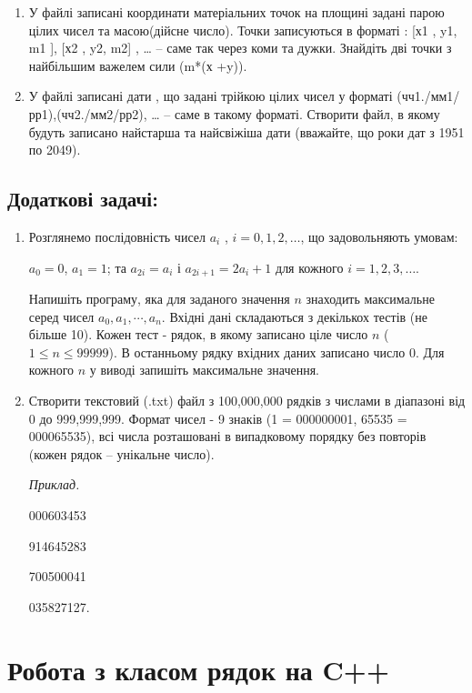 \documentclass[a5paper,titlepage,openany,twoside,
]
{book_unv}%
\begin{document}
\begin{enumerate}
\item 
У файлі записані координати матеріальних точок на площині задані
парою цілих чисел та масою(дійсне число). Точки записуються в форматі :
{[}х1 , y1, m1 {]}, {[}х2 , y2, m2{]} , \ldots{}  -- саме так
через коми та дужки. Знайдіть дві точки з найбільшим важелем сили (m*(х
+y)).

\item 
У файлі записані дати , що задані трійкою цілих чисел у форматі
(чч1./мм1/рр1),(чч2./мм2/рр2), \ldots{} -- саме в такому форматі.
Створити файл, в якому будуть записано найстарша та найсвіжіша дати
(вважайте, що роки дат з 1951 по 2049).
\end{enumerate}


\section{Додаткові задачі:}
\begin{enumerate}
\def\labelenumi{\arabic{enumi})}
\setcounter{enumi}{21}

\item  Розглянемо послідовність чисел \(a_{i}\) , $i = 0, 1, 2, \ldots$, що
задовольняють умовам:

\(a_{0} = 0\), \(a_{1} = 1\); та \(a_{2i} = a_{i}\) і
\(a_{2i + 1} = {2a}_{i} + 1\) для кожного $i = 1, 2, 3, \ldots{} $.

Напишіть програму, яка для заданого значення $n$ знаходить максимальне
серед чисел \(a_{0},a_{1},\cdots,a_{n}\). Вхідні дані складаються з
декількох тестів (не більше 10). Кожен тест - рядок, в якому записано
ціле число $n$ ($1 \le n \le 99 999$). В останньому рядку вхідних даних записано
число 0. Для кожного $n$ у виводі запишіть максимальне значення.

\item
Створити текстовий (.txt) файл з 100,000,000 рядків з числами
в діапазоні від 0 до 999,999,999. Формат чисел - 9 знаків 
(1 = 000000001, 65535 = 000065535), всі числа розташовані в випадковому порядку без
повторів (кожен рядок -- унікальне число).

\emph{Приклад.}

000603453
 
914645283 

700500041 

035827127. 

\end{enumerate}




\chapter{Робота з класом рядок на C++}
%
\end{document}
